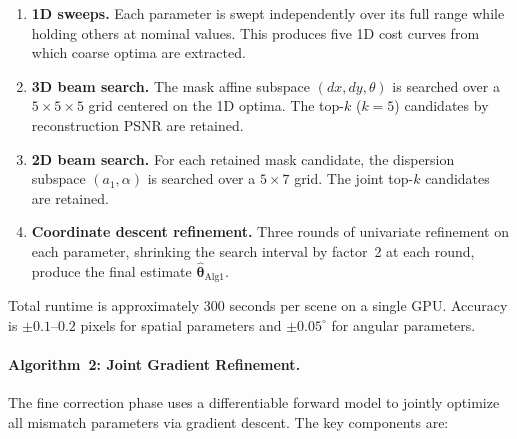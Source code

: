 \documentclass[11pt]{article}
\begin{document}
\begin{enumerate}
  \item \textbf{1D sweeps.}  Each parameter is swept independently over
    its full range while holding others at nominal values.  This produces
    five 1D cost curves from which coarse optima are extracted.
  \item \textbf{3D beam search.}  The mask affine subspace
    $(dx, dy, \theta)$ is searched over a $5 \times 5 \times 5$ grid
    centered on the 1D optima.  The top-$k$ ($k = 5$) candidates by
    reconstruction PSNR are retained.
  \item \textbf{2D beam search.}  For each retained mask candidate,
    the dispersion subspace $(a_1, \alpha)$ is searched over a
    $5 \times 7$ grid.  The joint top-$k$ candidates are retained.
  \item \textbf{Coordinate descent refinement.}  Three rounds of
    univariate refinement on each parameter, shrinking the search
    interval by factor~2 at each round, produce the final estimate
    $\hat{\boldsymbol{\theta}}_{\text{Alg1}}$.
\end{enumerate}

Total runtime is approximately 300 seconds per scene on a single GPU.
Accuracy is $\pm 0.1$--$0.2$ pixels for spatial parameters and
$\pm 0.05^\circ$ for angular parameters.

\paragraph{Algorithm~2: Joint Gradient Refinement.}
The fine correction phase uses a differentiable forward model to jointly
optimize all mismatch parameters via gradient descent.  The key components
are:
\end{document}
